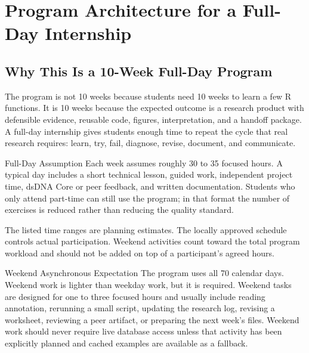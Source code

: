 \chapter{Program Architecture for a Full-Day Internship}

\section{Why This Is a 10-Week Full-Day Program}
The program is not 10 weeks because students need 10 weeks to learn a few R functions. It is 10 weeks because the expected outcome is a research product with defensible evidence, reusable code, figures, interpretation, and a handoff package. A full-day internship gives students enough time to repeat the cycle that real research requires: learn, try, fail, diagnose, revise, document, and communicate.

\begin{programbox}{Full-Day Assumption}
Each week assumes roughly 30 to 35 focused hours. A typical day includes a short technical lesson, guided work, independent project time, dsDNA Core or peer feedback, and written documentation. Students who only attend part-time can still use the program; in that format the number of exercises is reduced rather than reducing the quality standard.
\end{programbox}

The listed time ranges are planning estimates. The locally approved schedule
controls actual participation. Weekend activities count toward the total
program workload and should not be added on top of a participant's agreed
hours.

\begin{goldbox}{Weekend Asynchronous Expectation}
The program uses all 70 calendar days. Weekend work is lighter than weekday work, but it is required. Weekend tasks are designed for one to three focused hours and usually include reading annotation, rerunning a small script, updating the research log, revising a worksheet, reviewing a peer artifact, or preparing the next week's files. Weekend work should never require live database access unless that activity has been explicitly planned and cached examples are available as a fallback.
\end{goldbox}

